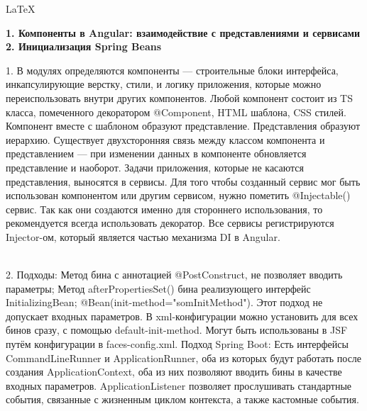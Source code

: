 \documentclass{article}
\newcommand{\bil}[4]{%
    \begin{minipage}{.3\textwidth}
        \textbf{1. #1} \\
        \textbf{2. #2}

        1. #3
        \\
        2. #4
    \end{minipage}
}
\begin{document}
\begin{center}
    \LaTeX
\end{center}
\tiny
\bil{Компоненты в Angular: взаимодействие с представлениями и сервисами}{Инициализация Spring Beans}{
    В модулях определяются компоненты — строительные блоки интерфейса, инкапсулирующие верстку, стили, и логику приложения, которые можно переиспользовать внутри других компонентов. 
    Любой компонент состоит из TS класса, помеченного декоратором @Component, HTML шаблона, CSS стилей. 
    Компонент вместе с шаблоном образуют представление. Представления образуют иерархию. 
    Существует двухсторонняя связь между классом компонента и представлением — при изменении данных в компоненте обновляется представление и наоборот.
    Задачи приложения, которые не касаются представления, выносятся в сервисы.
    Для того чтобы созданный сервис мог быть использован компонентом или другим сервисом, нужно пометить @Injectable() сервис. Так как они создаются именно для стороннего использования, то рекомендуется всегда использовать декоратор. Все сервисы регистрируются Injector-ом, который является частью механизма DI в Angular.
}{
    Подходы: Метод бина с аннотацией @PostConstruct, не позволяет вводить параметры; Метод afterPropertiesSet() бина реализующего интерфейс InitializingBean;
    @Bean(init-method="somInitMethod"). Этот подход не допускает входных параметров. В xml-конфигурации можно установить для всех бинов сразу, с помощью default-init-method.
    Могут быть использованы в JSF путём конфигурации в faces-config.xml. Подход Spring Boot: 
    Есть интерфейсы CommandLineRunner и ApplicationRunner, оба из которых будут работать после создания ApplicationContext, оба из них позволяют вводить бины в качестве входных параметров.
    ApplicationListener позволяет прослушивать стандартные события, связанные с жизненным циклом контекста, а также кастомные события.
}
\hfill
\end{document}
